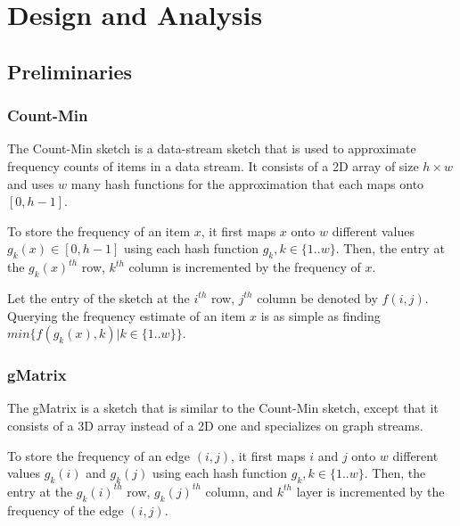
\chapter{Design and Analysis}

\ifpdf
    \graphicspath{{Chapter2/Figs/Raster/}{Chapter2/Figs/PDF/}{Chapter2/Figs/}}
\else
    \graphicspath{{Chapter2/Figs/Vector/}{Chapter2/Figs/}}
\fi


\section{Preliminaries}

\subsection{Count-Min}
The Count-Min\cite{cormode2005improved} sketch is a data-stream sketch that is used to approximate frequency counts of items in a data stream. It consists of a 2D array of size $h \times w$ and uses $w$ many hash functions for the approximation that each maps onto $[0,h-1]$.

To store the frequency of an item $x$, it first maps $x$ onto $w$ different values $g_k(x) \in [0,h-1]$ using each hash function $g_k, k \in \{1..w\}$. Then, the entry at the $g_k(x)^{th}$ row, $k^{th}$ column is incremented by the frequency of $x$.

Let the entry of the sketch at the $i^{th}$ row, $j^{th}$ column be denoted by $f(i,j)$. Querying the frequency estimate of an item $x$ is as simple as finding $min\{f(g_k(x),k)|k \in \{1..w\}\}$.

\subsection{gMatrix}
The gMatrix\cite{khan} is a sketch that is similar to the Count-Min sketch, except that it consists of a 3D array instead of a 2D one and specializes on graph streams.

To store the frequency of an edge $(i,j)$, it first maps $i$ and $j$ onto $w$ different values $g_k(i)$ and $g_k(j)$ using each hash function $g_k, k \in \{1..w\}$. Then, the entry at the $g_k(i)^{th}$ row, $g_k(j)^{th}$ column, and $k^{th}$ layer is incremented by the frequency of the edge $(i,j)$.

